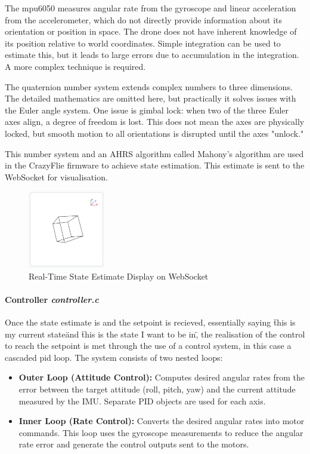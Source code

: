 The \gls{mpu6050} measures angular rate from the gyroscope and linear acceleration from the accelerometer, which do not directly provide information about its orientation or position in space. The drone does not have inherent knowledge of its position relative to world coordinates. Simple integration can be used to estimate this, but it leads to large errors due to accumulation in the integration. A more complex technique is required.

The quaternion number system extends complex numbers to three dimensions. The detailed mathematics are omitted here, but practically it solves issues with the Euler angle system. One issue is gimbal lock: when two of the three Euler axes align, a degree of freedom is lost. This does not mean the axes are physically locked, but smooth motion to all orientations is disrupted until the axes "unlock."

This number system and an AHRS algorithm called Mahony's algorithm are used in the CrazyFlie firmware to achieve state estimation. This estimate is sent to the WebSocket for visualisation.

\begin{figure}[H]
    \centering
    \captionsetup{justification=centering, margin=1cm}
    \includegraphics[width=0.3\textwidth]{img/websocket-state.PNG}
    \caption{Real-Time State Estimate Display on WebSocket}
    \label{fig:ws-state}
\end{figure}

\paragraph{\textbf{Controller} \textit{controller.c}} \leavevmode 

Once the state estimate is and the setpoint is recieved, essentially saying \"this is my current state\" and \"this is the state I want to be in\", the realisation of the control to reach the setpoint is met through the use of a control system, in this case a cascaded \gls{pid} loop. The system consists of two nested loops:

\begin{itemize}
    \item \textbf{Outer Loop (Attitude Control):} Computes desired angular rates from the error between the target attitude (roll, pitch, yaw) and the current attitude measured by the IMU. Separate PID objects are used for each axis.
    \item \textbf{Inner Loop (Rate Control):} Converts the desired angular rates into motor commands. This loop uses the gyroscope measurements to reduce the angular rate error and generate the control outputs sent to the motors.
\end{itemize}

